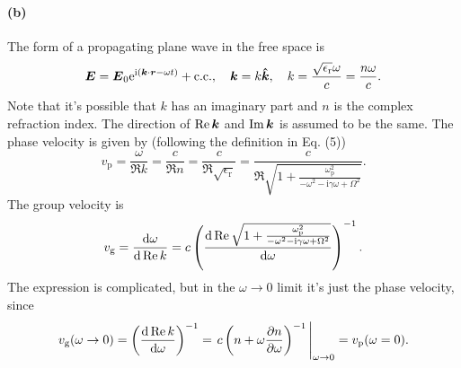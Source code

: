 \documentclass[hyperref, a4paper]{article}
\newcommand*{\ii}{\mathrm{i}}
\newcommand*{\ee}{\mathrm{e}}
\newcommand*{\omegap}{\omega_{\text{p}}}
\newcommand{\epsr}{\epsilon_{\text{r}}}
\begin{document}
\paragraph{(b)}
The form of a propagating plane wave in the free space is 
\begin{equation}
    \vb*{E} = \vb*{E}_0 \ee^{\ii (\vb*{k} \cdot \vb*{r} - \omega t)} + \text{c.c.}, \quad 
    \vb*{k} = k \vu*{k}, \quad k = \frac{\sqrt{\epsr} \omega}{c} = \frac{n \omega}{c}.
\end{equation}
Note that it's possible that $k$ has an imaginary part 
and $n$ is the complex refraction index.
The direction of $\Re \vb*{k}$ and $\Im \vb*{k}$ 
is assumed to be the same.
The phase velocity is given by 
(following the definition in \cite{bolda1994optical} Eq. (5))
\begin{equation}
    v_{\text{p}} = \frac{\omega}{\Re k} = \frac{c}{\Re n} = \frac{c}{\Re \sqrt{\epsr}}
    = \frac{c}{
        \Re \sqrt{
            1 + \frac{\omegap^2}{- \omega^2 - \ii \gamma \omega + \Omega^2}
        }
    }.
\end{equation}
The group velocity is 
\begin{equation}
    v_{\text{g}} = \frac{\dd{\omega}}{\dd{\Re k}}
    = c \left(
        \dv{
            \Re \sqrt{
                1 + \frac{\omegap^2}{- \omega^2 - \ii \gamma \omega + \Omega^2}
            }
        }{\omega}
    \right)^{-1}.
\end{equation}
The expression is complicated, but in the $\omega \to 0$ limit it's just 
the phase velocity, 
since 
\begin{equation}
    v_{\text{g}}(\omega \to 0) = \left(
        \dv{\Re k}{\omega}
    \right)^{-1} 
    =  \eval{
    c \left(
        n + \omega \pdv{n}{\omega}
    \right)^{-1}
    }_{\omega \to 0} = v_{\text{p}}(\omega = 0).
\end{equation}
\end{document}
